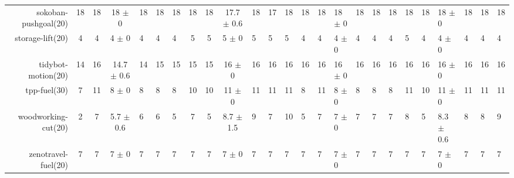 \begin{center}
\begin{tabular}{|rcccHHH|cccHHHHHHHHHHHHHHH|}
sokoban-pushgoal(20) & 18 & 18 & 18 \(\pm\) 0 & 18 & 18 & 18 & 18 & 18 & 17.7 \(\pm\) 0.6 & 18 & 17 & 18 & 18 & 18 & 18 \(\pm\) 0 & 18 & 18 & 18 & 18 & 18 & 18 \(\pm\) 0 & 18 & 18 & 18\\
storage-lift(20) & 4 & 4 & 4 \(\pm\) 0 & 4 & 4 & 4 & 5 & 5 & 5 \(\pm\) 0 & 5 & 5 & 5 & 4 & 4 & 4 \(\pm\) 0 & 4 & 4 & 4 & 5 & 4 & 4 \(\pm\) 0 & 4 & 4 & 4\\
tidybot-motion(20) & 14 & 16 & 14.7 \(\pm\) 0.6 & 14 & 15 & 15 & 15 & 15 & 16 \(\pm\) 0 & 16 & 16 & 16 & 16 & 16 & 16 \(\pm\) 0 & 16 & 16 & 16 & 16 & 16 & 16 \(\pm\) 0 & 16 & 16 & 16\\
tpp-fuel(30) & 7 & 11 & 8 \(\pm\) 0 & 8 & 8 & 8 & 10 & 10 & 11 \(\pm\) 0 & 11 & 11 & 11 & 8 & 11 & 8 \(\pm\) 0 & 8 & 8 & 8 & 11 & 10 & 11 \(\pm\) 0 & 11 & 11 & 11\\
woodworking-cut(20) & 2 & 7 & 5.7 \(\pm\) 0.6 & 6 & 6 & 5 & 7 & 5 & 8.7 \(\pm\) 1.5 & 9 & 7 & 10 & 5 & 7 & 7 \(\pm\) 0 & 7 & 7 & 7 & 8 & 5 & 8.3 \(\pm\) 0.6 & 8 & 8 & 9\\
zenotravel-fuel(20) & 7 & 7 & 7 \(\pm\) 0 & 7 & 7 & 7 & 7 & 7 & 7 \(\pm\) 0 & 7 & 7 & 7 & 7 & 7 & 7 \(\pm\) 0 & 7 & 7 & 7 & 7 & 7 & 7 \(\pm\) 0 & 7 & 7 & 7\\
\end{tabular}
\end{center}
